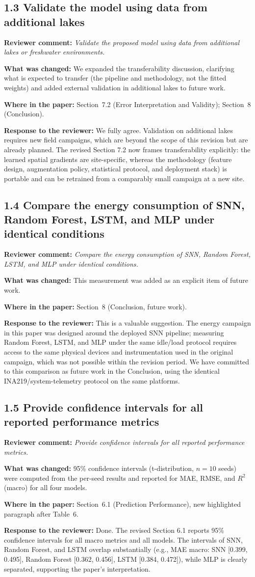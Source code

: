 \documentclass[11pt,a4paper]{article}
\newcommand{\comment}[1]{\textbf{Reviewer comment:} \textit{#1}}
\newcommand{\change}[1]{\textbf{What was changed:} #1}
\newcommand{\where}[1]{\textbf{Where in the paper:} #1}
\newcommand{\resp}[1]{\textbf{Response to the reviewer:} \textcolor{revblue}{#1}}
\newcommand{\pt}[1]{\subsection*{#1}}
\begin{document}
\pt{1.3 Validate the model using data from additional lakes}
\comment{Validate the proposed model using data from additional lakes or freshwater environments.}

\change{We expanded the transferability discussion, clarifying what is expected to transfer (the pipeline and methodology, not the fitted weights) and added external validation in additional lakes to future work.}

\where{Section~7.2 (Error Interpretation and Validity); Section~8 (Conclusion).}

\resp{We fully agree. Validation on additional lakes requires new field campaigns, which are beyond the scope of this revision but are already planned. The revised Section 7.2 now frames transferability explicitly: the learned spatial gradients are site-specific, whereas the methodology (feature design, augmentation policy, statistical protocol, and deployment stack) is portable and can be retrained from a comparably small campaign at a new site.}

\pt{1.4 Compare the energy consumption of SNN, Random Forest, LSTM, and MLP under identical conditions}
\comment{Compare the energy consumption of SNN, Random Forest, LSTM, and MLP under identical conditions.}

\change{This measurement was added as an explicit item of future work.}

\where{Section~8 (Conclusion, future work).}

\resp{This is a valuable suggestion. The energy campaign in this paper was designed around the deployed SNN pipeline; measuring Random Forest, LSTM, and MLP under the same idle/load protocol requires access to the same physical devices and instrumentation used in the original campaign, which was not possible within the revision period. We have committed to this comparison as future work in the Conclusion, using the identical INA219/system-telemetry protocol on the same platforms.}

\pt{1.5 Provide confidence intervals for all reported performance metrics}
\comment{Provide confidence intervals for all reported performance metrics.}

\change{95\% confidence intervals (t-distribution, $n=10$ seeds) were computed from the per-seed results and reported for MAE, RMSE, and $R^2$ (macro) for all four models.}

\where{Section~6.1 (Prediction Performance), new highlighted paragraph after Table~6.}

\resp{Done. The revised Section 6.1 reports 95\% confidence intervals for all macro metrics and all models. The intervals of SNN, Random Forest, and LSTM overlap substantially (e.g., MAE macro: SNN [0.399, 0.495], Random Forest [0.362, 0.456], LSTM [0.384, 0.472]), while MLP is clearly separated, supporting the paper's interpretation.}
\end{document}
